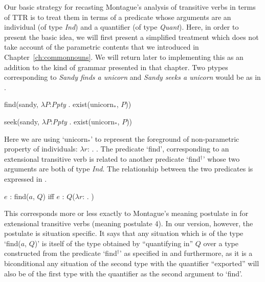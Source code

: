Our basic strategy for recasting Montague's analysis of transitive
verbs in terms of TTR is to treat them in terms of a predicate whose
arguments are an individual (of type \textit{Ind}) and a quantifier
(of type \textit{Quant}).  Here, in order to present the basic idea, we will first present a simplified
treatment which does not take account of the parametric contents that
we introduced in Chapter~\ref{ch:commonnouns}.  We will return later
to implementing this as an addition to the kind of grammar presented
in that chapter.  Two ptypes corresponding to
\textit{Sandy finds a unicorn} and \textit{Sandy seeks a unicorn}
would be as in \nexteg{}.
\begin{ex} 
\begin{subex} 
 
\item find(sandy, $\lambda P$:\textit{Ppty} . exist(unicorn$_*$, $P$)) 
 
\item seek(sandy, $\lambda P$:\textit{Ppty} . exist(unicorn$_*$, $P$)) 
 
\end{subex} 

\end{ex} 
Here we are using `unicorn$_*$' to represent the foreground of  non-parametric
property of individuals: $\lambda
r$:
. .  The predicate
`find', corresponding to an extensional transitive verb is related to
another predicate `find$^{\dagger}$' whose two arguments are both of
type \textit{Ind}.  The relationship between the two predicates is
expressed in \nexteg{}.
\begin{ex} 
$e$ : find($a$, $Q$) iff $e$ : $Q$($\lambda
r$: . )
\label{ex:mp-find} 
\end{ex} 
This corresponds more or less exactly to Montague's meaning postulate
in \cite{Montague1973} for extensional transitive verbs (meaning
postulate 4).  In our version, however, the postulate is situation
specific.  It says that any situation which is of the type `find($a$,
$Q$)' is itself of the type obtained by ``quantifying in'' $Q$ over a
type constructed from the predicate `find$^{\dagger}$' as specified
in \preveg{} and furthermore, as it is a biconditional any situation
of the second type with the quantifier ``exported'' will also be of
the first type with the quantifier as the second argument to `find'. 

